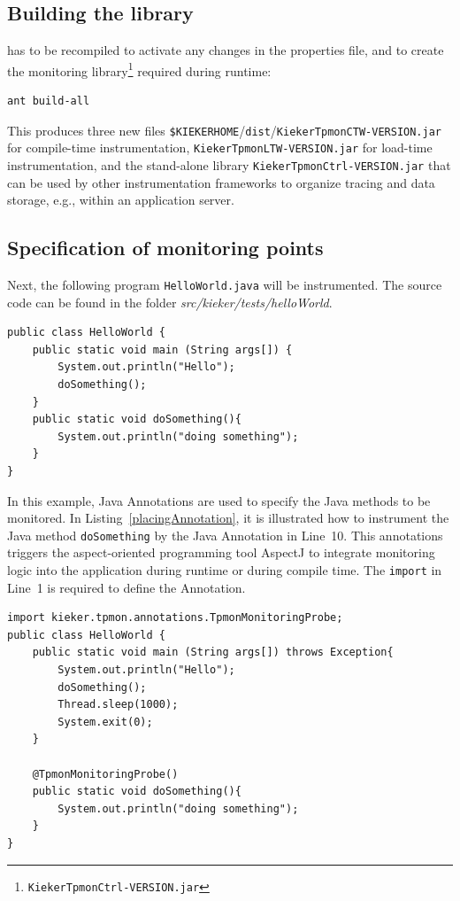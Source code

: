 \documentclass[a4paper,12pt]{scrartcl}
\begin{document}
\subsection{Building the \tpmon{} library}
\tpmon{} has to be recompiled to activate any changes in the properties file, and to create the monitoring library\footnote{\texttt{KiekerTpmonCtrl-VERSION.jar}} required during runtime:
\begin{lstlisting}[]
ant build-all
\end{lstlisting}
This produces three new files \texttt{\$KIEKERHOME}/\texttt{dist}/\texttt{KiekerTpmonCTW-VERSION.jar} for compile-time instrumentation, \texttt{KiekerTpmonLTW-VERSION.jar} for load-time instrumentation, and the stand-alone library \texttt{KiekerTpmonCtrl-VERSION.jar} that can be used by other instrumentation frameworks to organize tracing and data storage, e.g., within an application server.

\subsection{Specification of monitoring points}\label{sec.tutorial.annotation}
Next, the following program \texttt{HelloWorld.java} will be instrumented. The source code can be found in the folder \textit{src/kieker/tests/helloWorld}.
\begin{lstlisting}[caption={\texttt{HelloWorld.java}},label={lst1}]
public class HelloWorld {
	public static void main (String args[]) {
		System.out.println("Hello");
		doSomething();
	}
	public static void doSomething(){
		System.out.println("doing something");
	}
}
\end{lstlisting}

In this example, Java Annotations are used to specify the Java methods to be monitored. In Listing~\ref{placingAnnotation}, it is illustrated how to instrument the Java method \texttt{doSomething} by the Java Annotation in Line~10. This annotations triggers the aspect-oriented programming tool AspectJ to integrate monitoring logic into the application during runtime or during compile time. The \texttt{import} in Line~1 is required to define the Annotation.

\begin{lstlisting}[caption={Lines 1 and 10 are added to instrument this simple ``Hello World'' Java program.},label={placingAnnotation}]
import kieker.tpmon.annotations.TpmonMonitoringProbe;
public class HelloWorld {
	public static void main (String args[]) throws Exception{
		System.out.println("Hello");
		doSomething();
		Thread.sleep(1000);
		System.exit(0);
	}

	@TpmonMonitoringProbe()
	public static void doSomething(){
		System.out.println("doing something");
	}
}
\end{lstlisting}
\end{document}
